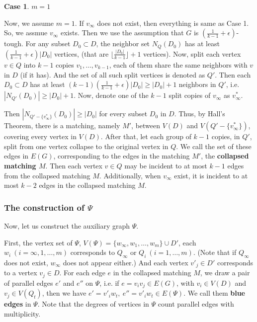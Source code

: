 \documentclass[12pt]{article}
\newtheorem{case}{Case}
\begin{document}
\begin{case}$m=1$\end{case}
Now, we assume $m=1$. If $v_{\infty}$ does not exist, then everything is same as Case 1.
So, we assmue $v_{\infty}$ exists. Then we use the assumption that $G$ is $(\frac{1}{k-1}+\epsilon)$-tough. For any subset $D_0\subset D$, the neighbor set $N_Q(D_0)$ has at least $(\frac{1}{k-1}+\epsilon)|D_0|$ vertices, (that are $\lfloor\frac{|D_0|}{k-1}\rfloor+1$ vertices).
Now, split each vertex $v\in Q$ into $k-1$ copies $v_1,\ldots,v_{k-1}$, each of them share the same neighbors with $v$ in $D$ (if it has). And the set of all such split vertices is denoted as $Q'$. Then each $D_0\subset D$ has at least $(k-1)(\frac{1}{k-1}+\epsilon)|D_0|\ge|D_0|+1$ neighbors in $Q'$, i.e. $|N_{Q'}(D_0)|\ge|D_0|+1$. Now, denote one of the $k-1$ split copies of $v_{\infty}$ as $v^*_{\infty}$.

Then $|N_{Q'-\{v^*_{\infty}\}}(D_0)|\ge|D_0|$ for every subset $D_0$ in $D$. Thus, by Hall's Theorem, there is a matching, namely $M'$, between $V(D)$ and $V(Q'-\{v^*_{\infty}\})$, covering every vertex in $V(D)$. 
After that, let each group of $k-1$ copies, in $Q'$, split from one vertex collapse to the original vertex in $Q$. We call the set of these edges in $E(G)$, corresponding to the edges in the matching $M'$, the {\bf collapsed matching $M$}. Then each vertex $v\in Q$ may be incident to at most $k-1$ edges from the collapsed matching $M$.
Additionally, when $v_{\infty}$ exist, it is incident to at most $k-2$ edges in the collapsed matching $M$.









\subsubsection{The construction of $\Psi$}
Now, let us construct the auxiliary graph $\Psi$.

First, the vertex set of $\Psi$, $V(\Psi)=\{w_{\infty},w_1,\ldots,w_m\}\cup D'$, each $w_i~(i=\infty,1,\ldots,m)$ corresponds to $Q_{\infty}$ or $Q_i~(i=1,\ldots,m)$. (Note that if $Q_{\infty}$ does not exist, $w_{\infty}$ does not appear either.) And each vertex $v'_j\in D'$ corresponds to a vertex $v_j\in D$. For each edge $e$ in the collapsed matching $M$, we draw a pair of parallel edges $e'$ and $e''$ on $\Psi$, i.e. if $e=v_iv_j\in E(G)$, with $v_i\in V(D)$ and $v_j\in V(Q_t)$, then we have $e'=v'_iw_t,~e''=v'_iw_t\in E(\Psi)$. We call them {\bf blue edges} in $\Psi$. Note that the degrees of vertices in $\Psi$ count parallel edges with multiplicity.
\end{document}
